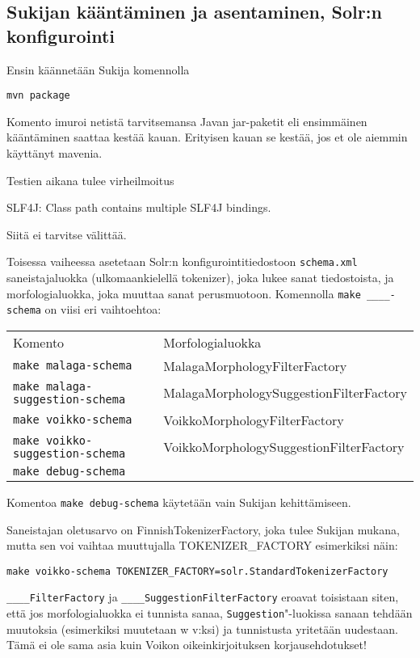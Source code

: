 \documentclass[12pt,a4paper]{scrartcl}
\begin{document}
\subsection*{Sukijan kääntäminen ja asentaminen, Solr:n konfigurointi}

Ensin käännetään Sukija komennolla

\verb=mvn package=

Komento imuroi netistä tarvitsemansa Javan jar-paketit eli ensimmäinen
kääntäminen saattaa kestää kauan. Erityisen kauan se kestää, jos et
ole aiemmin käyttänyt mavenia.

Testien aikana tulee virheilmoitus

SLF4J: Class path contains multiple SLF4J bindings.

Siitä ei tarvitse välittää.

\bigskip Toisessa vaiheessa asetetaan Solr:n konfigurointitiedostoon
\verb=schema.xml= saneistajaluokka (ulkomaankielellä tokenizer), joka
lukee sanat tiedostoista, ja morfologialuokka, joka muuttaa sanat
perusmuotoon. Komennolla \verb|make ____-schema| on viisi eri
vaihtoehtoa:

\begin{tabular}{@{}ll}
Komento                              & Morfologialuokka \\
\verb=make malaga-schema=            & MalagaMorphologyFilterFactory \\
\verb=make malaga-suggestion-schema= & MalagaMorphologySuggestionFilterFactory \\
\verb=make voikko-schema=            & VoikkoMorphologyFilterFactory \\
\verb=make voikko-suggestion-schema= & VoikkoMorphologySuggestionFilterFactory \\
\verb=make debug-schema=             &
\end{tabular}

Komentoa \verb=make debug-schema= käytetään vain Sukijan
kehittämiseen.

Saneistajan oletusarvo on FinnishTokenizerFactory, joka tulee Sukijan
mukana, mutta sen voi vaihtaa muuttujalla TOKENIZER\_FACTORY
esimerkiksi näin:

\verb|make voikko-schema TOKENIZER_FACTORY=solr.StandardTokenizerFactory|

\verb=____FilterFactory= ja \verb=____SuggestionFilterFactory= eroavat
toisistaan siten, että jos morfologialuokka ei tunnista sanaa,
\verb=Suggestion="-luokissa sanaan tehdään muutoksia (esimerkiksi
muutetaan w v:ksi) ja tunnistusta yritetään uudestaan. Tämä ei ole
sama asia kuin Voikon oikeinkirjoituksen korjausehdotukset!
\end{document}
